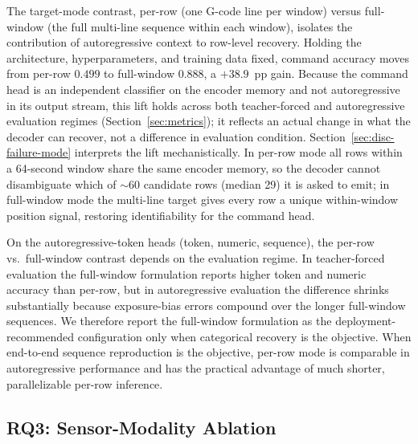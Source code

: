 \documentclass[sensors,article,submit,moreauthors,pdftex]{Definitions/mdpi}
\begin{document}
The target-mode contrast, per-row (one G-code line per window) versus full-window (the full multi-line sequence within each window), isolates the contribution of autoregressive context to row-level recovery. Holding the architecture, hyperparameters, and training data fixed, command accuracy moves from per-row $0.499$ to full-window $0.888$, a $+38.9$~pp gain. Because the command head is an independent classifier on the encoder memory and not autoregressive in its output stream, this lift holds across both teacher-forced and autoregressive evaluation regimes (Section~\ref{sec:metrics}); it reflects an actual change in what the decoder can recover, not a difference in evaluation condition. Section~\ref{sec:disc-failure-mode} interprets the lift mechanistically. In per-row mode all rows within a 64-second window share the same encoder memory, so the decoder cannot disambiguate which of $\sim$60 candidate rows (median 29) it is asked to emit; in full-window mode the multi-line target gives every row a unique within-window position signal, restoring identifiability for the command head.

On the autoregressive-token heads (token, numeric, sequence), the per-row vs.\ full-window contrast depends on the evaluation regime. In teacher-forced evaluation the full-window formulation reports higher token and numeric accuracy than per-row, but in autoregressive evaluation the difference shrinks substantially because exposure-bias errors compound over the longer full-window sequences. We therefore report the full-window formulation as the deployment-recommended configuration only when categorical recovery is the objective. When end-to-end sequence reproduction is the objective, per-row mode is comparable in autoregressive performance and has the practical advantage of much shorter, parallelizable per-row inference.

\subsection{RQ3: Sensor-Modality Ablation}
\label{sec:abl-sensors}
\end{document}
